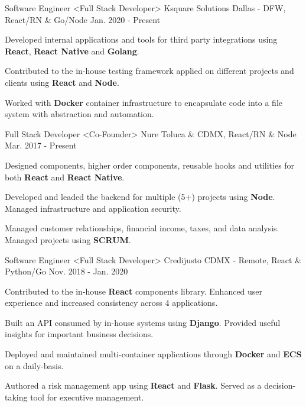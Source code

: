 \begin{cventries}
  \cventry
    {Software Engineer <Full Stack Developer>}
    {Ksquare Solutions}
    {Dallas - DFW, React/RN \& Go/Node}
    {Jan. 2020 - Present}
    {
      \begin{cvitems}
        \item {Developed internal applications and tools for third party integrations using \textbf{React}, \textbf{React Native} and \textbf{Golang}.}
        \item {Contributed to the in-house testing framework applied on different projects and clients using \textbf{React} and \textbf{Node}.}
        \item {Worked with \textbf{Docker} container infrastructure to encapsulate code into a file system with abstraction and automation.}
      \end{cvitems}
    }
  \cventry
    {Full Stack Developer <Co-Founder>}
    {Nure}
    {Toluca \& CDMX, React/RN \& Node}
    {Mar. 2017 - Present}
    {
      \begin{cvitems}
        \item {Designed components, higher order components, reusable hooks and utilities for both \textbf{React} and \textbf{React Native}.}
        \item {Developed and leaded the backend for multiple (5+) projects using \textbf{Node}. Managed infrastructure and application security.}
         \item {Managed customer relationships, financial income, taxes, and data analysis. Managed projects using \textbf{SCRUM}.}
      \end{cvitems}
    }
  \cventry
    {Software Engineer <Full Stack Developer>}
    {Credijusto}
    {CDMX - Remote, React \& Python/Go}
    {Nov. 2018 - Jan. 2020}
    {
      \begin{cvitems}
        \item {Contributed to the in-house \textbf{React} components library. Enhanced user experience and increased consistency across 4 applications.}
        \item {Built an API consumed by in-house systems using \textbf{Django}. Provided useful insights for important business decisions.}
        \item {Deployed and maintained multi-container applications through \textbf{Docker} and \textbf{ECS} on a daily-basis.}
        \item {Authored a risk management app using \textbf{React} and \textbf{Flask}. Served as a decision-taking tool for executive management.}

\end{cvitems}}
\end{cventries}
